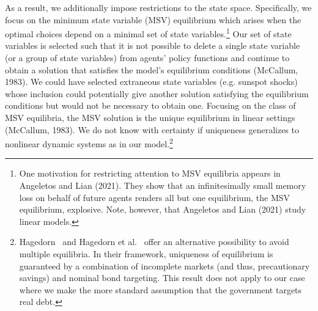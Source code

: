 \documentclass[\latexroot/\projectname]{subfiles}
\begin{document}
As a result, we additionally impose restrictions to the state space. Specifically, we focus on the minimum state variable (MSV) equilibrium which arises when the optimal choices depend on a minimal set of state variables.\footnote{One motivation for restricting attention to MSV equilibria appears in Angeletos and Lian (2021). They show that an infinitesimally small memory loss on behalf of future agents renders all but one equilibrium, the MSV equilibrium, explosive. Note, however, that Angeletos and Lian (2021) study linear models.} Our set of state variables is selected such that it is not possible to delete a single state variable (or a group of state variables) from agents' policy functions and continue to obtain a solution that satisfies the model's equilibrium conditions (McCallum, 1983). We could have selected extraneous state variables (e.g. sunspot shocks) whose inclusion could potentially give another solution satisfying the equilibrium conditions but would not be necessary to obtain one. Focusing on the class of MSV equilibria, the MSV solution is the unique equilibrium in linear settings (McCallum, 1983). We do not know with certainty if uniqueness generalizes to nonlinear dynamic systems as in our model.\footnote{Hagedorn~\cite{Hagedorn2016-un} and Hagedorn et al.~\cite{Hagedorn2019-op} offer an alternative possibility to avoid multiple equilibria. In their framework, uniqueness of equilibrium is guaranteed by a combination of incomplete markets (and thus, precautionary savings) and nominal bond targeting. This result does not apply to our case where we make the more standard assumption that the government targets real debt.}


\smartbib

\pdfonly{
  \captionsetup[figure]{list=no}
  \captionsetup[table]{list=no}
}
\end{document}
